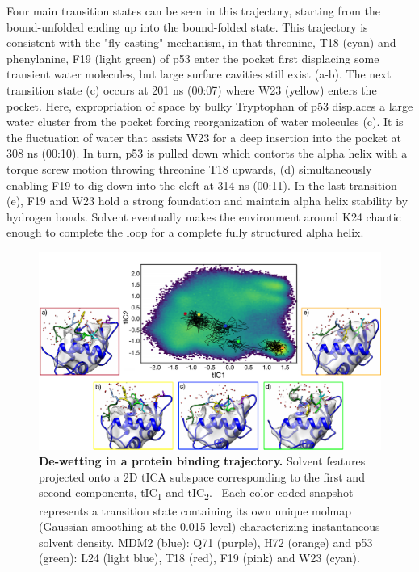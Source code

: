 Four main transition states can be seen in this trajectory, starting from the bound-unfolded ending up into the bound-folded state. This trajectory is consistent with the "fly-casting" mechanism, in that threonine, T18 (cyan) and phenylanine, F19 (light green) of p53 enter the pocket first displacing some transient water molecules, but large surface cavities still exist (a-b). The next transition state (c) occurs at 201 ns (00:07) where W23 (yellow) enters the pocket. Here, expropriation of space by bulky Tryptophan of p53 displaces a large water cluster from the pocket forcing reorganization of water molecules (c). It is the fluctuation of water that assists W23 for a deep insertion into the pocket at 308 ns (00:10). In turn, p53 is pulled down which contorts the alpha helix with a torque screw motion throwing threonine T18 upwards, (d) simultaneously enabling F19 to dig down into the cleft at 314 ns (00:11). In the last transition (e), F19 and W23 hold a strong foundation and maintain alpha helix stability by hydrogen bonds. Solvent eventually makes the environment around K24 chaotic enough to complete the loop for a complete fully structured alpha helix.

\begin{figure}[h!]
\centering
\includegraphics[scale=0.75]{Figures/Partitioned/Partitioned_final.pdf}
\caption{\textbf{De-wetting in a protein binding trajectory.} Solvent
features projected onto a 2D tICA subspace corresponding to the first
and second components, tIC\textsubscript{1} and tIC\textsubscript{2}.~
Each color-coded snapshot represents a transition state containing its
own unique molmap (Gaussian smoothing at the 0.015 level) characterizing
instantaneous solvent density. MDM2 (blue): Q71 (purple), H72 (orange)
and p53 (green): L24 (light blue), T18 (red), F19 (pink) and W23 (cyan).}
\label{fig:tica}
\end{figure}



